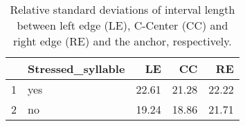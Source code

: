 \begin{table}[ht]
\centering
\begin{tabular}{rlrrr}
  \hline
 & Stressed\_syllable & LE & CC & RE \\ 
  \hline
1 & yes & 22.61 & 21.28 & 22.22 \\ 
  2 & no & 19.24 & 18.86 & 21.71 \\ 
   \hline
\end{tabular}
\caption{Relative standard deviations  of interval length between left edge (LE), C-Center (CC) and right edge (RE) and the anchor, respectively.\label{tab:rel_sds}} 
\end{table}
